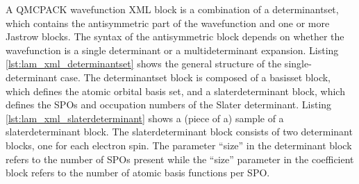 {A QMCPACK wavefunction XML block is a combination of a determinantset, which
contains the antisymmetric part of the wavefunction and one or more Jastrow blocks.
The syntax of the antisymmetric block depends on whether the wavefunction is a single
determinant or a multideterminant expansion. Listing \ref{lst:lam_xml_determinantset} 
shows the general structure of the
single-determinant case. The determinantset block is composed of a basisset block, which
defines the atomic orbital basis set, and a slaterdeterminant block, which defines the SPOs and occupation numbers of the Slater determinant.
 Listing \ref{lst:lam_xml_slaterdeterminant} shows a (piece of a) sample of a 
slaterdeterminant block. The
slaterdeterminant block consists of two determinant blocks, one for each electron spin. The
parameter ``size” in the determinant block refers to the number of SPOs
present while the ``size” parameter in the coefficient block refers to the number of atomic
basis functions per SPO.

}
